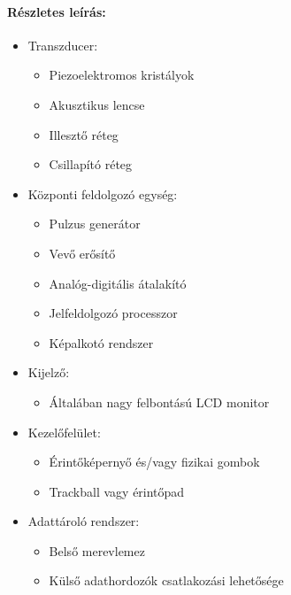 \documentclass[a4paper,12pt]{article}
\begin{document}
\paragraph{Részletes leírás:} \begin{itemize} \item Transzducer: \begin{itemize} \item Piezoelektromos kristályok \item Akusztikus lencse \item Illesztő réteg \item Csillapító réteg \end{itemize} \item Központi feldolgozó egység: \begin{itemize} \item Pulzus generátor \item Vevő erősítő \item Analóg-digitális átalakító \item Jelfeldolgozó processzor \item Képalkotó rendszer \end{itemize} \item Kijelző: \begin{itemize} \item Általában nagy felbontású LCD monitor \end{itemize} \item Kezelőfelület: \begin{itemize} \item Érintőképernyő és/vagy fizikai gombok \item Trackball vagy érintőpad \end{itemize} \item Adattároló rendszer: \begin{itemize} \item Belső merevlemez \item Külső adathordozók csatlakozási lehetősége \end{itemize} \end{itemize}
\end{document}
